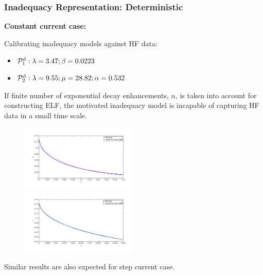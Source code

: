 \documentclass[10pt,xcolor=dvipsnames,compress]{beamer}
\begin{document}
\begin{frame}
\frametitle{Inadequacy Representation: Deterministic}
\vfill


\textbf{Constant current case:}


Calibrating inadequacy models against HF data: 

\begin{itemize}

\item $\mathcal{P}_1^{\rm d}:   \lambda = 3.47; \beta = 0.0223$

\item $\mathcal{P}_2^{\rm d}:   \lambda = 9.55; \mu = 28.82; \alpha = 0.532$

\end{itemize}

If finite number of exponential decay enhancements, $n$, is taken into account for constructing ELF, the motivated inadequacy model is incapable of capturing HF data in a small time scale.
\begin{figure}
\includegraphics[trim = 1.in 1.in 1.in 1.3in, clip, width=0.5\textwidth]{figs/Iconst_eps_modelfit_1st_zoom.png}
~
\includegraphics[trim = 1.in 1.in 1.in 1.3in, clip, width=0.5\textwidth]{figs/Iconst_eps_modelfit_2nd_zoom.png}
\end{figure}


Similar results are also expected for step current case.

\vfill
\end{frame}
\end{document}
